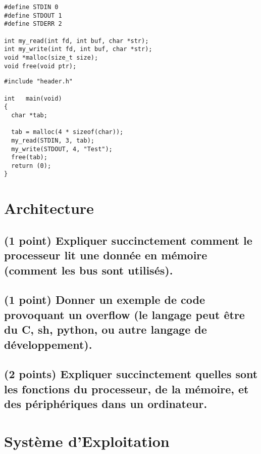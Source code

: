 \documentclass[11pt,a4paper]{article}
\begin{document}
\bigskip

\lstset{language=c}
\begin{lstlisting}[frame=single,title={header.h}]
#define STDIN 0
#define STDOUT 1
#define STDERR 2

int my_read(int fd, int buf, char *str);
int my_write(int fd, int buf, char *str);
void *malloc(size_t size);
void free(void ptr);
\end{lstlisting}

\lstset{language=c}
\begin{lstlisting}[frame=single,title={main.c}]
#include "header.h"

int   main(void)
{
  char *tab;

  tab = malloc(4 * sizeof(char));
  my_read(STDIN, 3, tab);
  my_write(STDOUT, 4, "Test");
  free(tab);
  return (0);
}
\end{lstlisting}

\bigskip
\bigskip
\bigskip

\pagebreak

\section{Architecture} %

\subsection{(1 point) Expliquer succinctement comment le processeur lit une donnée en mémoire (comment les bus sont utilisés).}

\bigskip

\subsection{(1 point) Donner un exemple de code provoquant un overflow (le langage peut être du C, sh, python, ou autre langage de développement).}

\bigskip

\subsection{(2 points) Expliquer succinctement quelles sont les fonctions du processeur, de la mémoire, et des périphériques dans un ordinateur.}

\bigskip
\bigskip
\bigskip

\section{Système d'Exploitation} %
\end{document}
